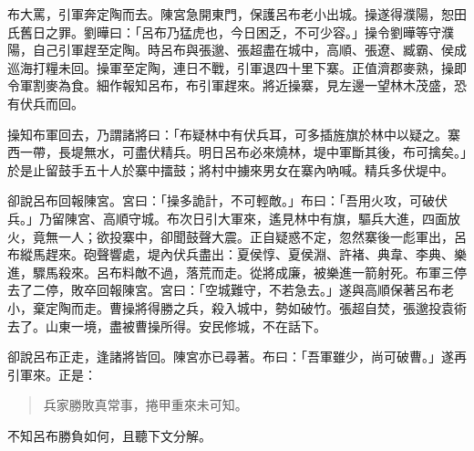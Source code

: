 布大罵，引軍奔定陶而去。陳宮急開東門，保護呂布老小出城。操遂得濮陽，恕田氏舊日之罪。劉曄曰：「呂布乃猛虎也，今日困乏，不可少容。」操令劉曄等守濮陽，自己引軍趕至定陶。時呂布與張邈、張超盡在城中，高順、張遼、臧霸、侯成巡海打糧未回。操軍至定陶，連日不戰，引軍退四十里下寨。正值濟郡麥熟，操即令軍割麥為食。細作報知呂布，布引軍趕來。將近操寨，見左邊一望林木茂盛，恐有伏兵而回。

操知布軍回去，乃謂諸將曰：「布疑林中有伏兵耳，可多插旌旗於林中以疑之。寨西一帶，長堤無水，可盡伏精兵。明日呂布必來燒林，堤中軍斷其後，布可擒矣。」於是止留鼓手五十人於寨中擂鼓；將村中擄來男女在寨內吶喊。精兵多伏堤中。

卻說呂布回報陳宮。宮曰：「操多詭計，不可輕敵。」布曰：「吾用火攻，可破伏兵。」乃留陳宮、高順守城。布次日引大軍來，遙見林中有旗，驅兵大進，四面放火，竟無一人；欲投寨中，卻聞鼓聲大震。正自疑惑不定，忽然寨後一彪軍出，呂布縱馬趕來。砲聲響處，堤內伏兵盡出：夏侯惇、夏侯淵、許褚、典韋、李典、樂進，驟馬殺來。呂布料敵不過，落荒而走。從將成廉，被樂進一箭射死。布軍三停去了二停，敗卒回報陳宮。宮曰：「空城難守，不若急去。」遂與高順保著呂布老小，棄定陶而走。曹操將得勝之兵，殺入城中，勢如破竹。張超自焚，張邈投袁術去了。山東一境，盡被曹操所得。安民修城，不在話下。

卻說呂布正走，逢諸將皆回。陳宮亦已尋著。布曰：「吾軍雖少，尚可破曹。」遂再引軍來。正是：

\begin{quote}
兵家勝敗真常事，捲甲重來未可知。
\end{quote}

不知呂布勝負如何，且聽下文分解。
